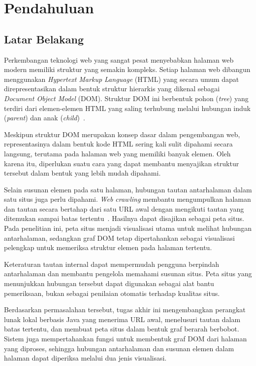 \chapter{Pendahuluan}
\label{chap:intro}

\section{Latar Belakang}
\label{sec:1:latar_belakang}

   Perkembangan teknologi web yang sangat pesat menyebabkan halaman web modern memiliki struktur yang semakin kompleks. Setiap halaman web dibangun menggunakan \textit{Hypertext Markup Language} (HTML) yang secara umum dapat direpresentasikan dalam bentuk struktur hierarkis yang dikenal sebagai \textit{Document Object Model} (DOM). Struktur DOM ini berbentuk pohon (\textit{tree}) yang terdiri dari elemen-elemen HTML yang saling terhubung melalui hubungan induk (\textit{parent}) dan anak (\textit{child})~\cite{marini:02:thedom}.

    Meskipun struktur DOM merupakan konsep dasar dalam pengembangan web, representasinya dalam bentuk kode HTML sering kali sulit dipahami secara langsung, terutama pada halaman web yang memiliki banyak elemen. Oleh karena itu, diperlukan suatu cara yang dapat membantu menyajikan struktur tersebut dalam bentuk yang lebih mudah dipahami.
    
    Selain susunan elemen pada satu halaman, hubungan tautan antarhalaman dalam satu situs juga perlu dipahami. \textit{Web crawling} membantu mengumpulkan halaman dan tautan secara bertahap dari satu URL awal dengan mengikuti tautan yang ditemukan sampai batas tertentu~\cite{manning:08:introir}. Hasilnya dapat disajikan sebagai peta situs. Pada penelitian ini, peta situs menjadi visualisasi utama untuk melihat hubungan antarhalaman, sedangkan graf DOM tetap dipertahankan sebagai visualisasi pelengkap untuk memeriksa struktur elemen pada halaman tertentu.
    
    Keteraturan tautan internal dapat mempermudah pengguna berpindah antarhalaman dan membantu pengelola memahami susunan situs. Peta situs yang menunjukkan hubungan tersebut dapat digunakan sebagai alat bantu pemeriksaan, bukan sebagai penilaian otomatis terhadap kualitas situs.

    Berdasarkan permasalahan tersebut, tugas akhir ini mengembangkan perangkat lunak lokal berbasis Java yang menerima URL awal, menelusuri tautan dalam batas tertentu, dan membuat peta situs dalam bentuk graf berarah berbobot. Sistem juga mempertahankan fungsi untuk membentuk graf DOM dari halaman yang diproses, sehingga hubungan antarhalaman dan susunan elemen dalam halaman dapat diperiksa melalui dua jenis visualisasi.

